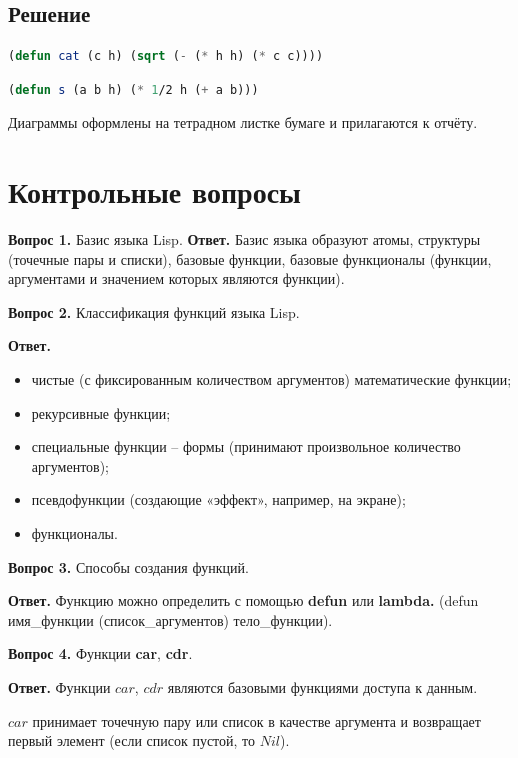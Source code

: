 \documentclass[12pt]{report}
\begin{document}
\subsection*{Решение}
\begin{lstlisting}[label=101xd,caption=Решение задания №10.1, language=lisp]
(defun cat (c h) (sqrt (- (* h h) (* c c))))
\end{lstlisting}
\begin{lstlisting}[label=102xd,caption=Решение задания №10.2, language=lisp]
(defun s (a b h) (* 1/2 h (+ a b)))
\end{lstlisting}
Диаграммы оформлены на тетрадном листке бумаге и прилагаются к отчёту.
\section*{Контрольные вопросы}

\textbf{Вопрос 1.} Базис языка Lisp. \newline
\indent\textbf{Ответ. }
Базис языка образуют атомы, структуры (точечные пары и списки), базовые функции, базовые функционалы (функции, аргументами и значением которых являются функции).

\textbf{Вопрос 2.} Классификация функций языка Lisp.
	
\textbf{Ответ.} 
	
\begin{itemize}
	\item чистые (с фиксированным количеством аргументов) математические функции;
	\item рекурсивные функции;
	\item специальные функции – формы (принимают произвольное количество аргументов);
	\item псевдофункции (создающие «эффект», например, на экране);
	\item функционалы.
\end{itemize}

\textbf{Вопрос 3.} Способы создания функций.
	
\textbf{Ответ.} 
Функцию можно определить с помощью \textbf{defun} или \textbf{lambda.} (defun имя\_функции (список\_аргументов) тело\_функции).

\textbf{Вопрос 4.} Функции \textbf{car}, \textbf{cdr}.
	
\textbf{Ответ.} Функции $car$, $cdr$ являются базовыми функциями доступа к данным. 

$car$ принимает точечную пару или список в качестве аргумента и возвращает первый элемент (если список пустой, то $Nil$). 
\end{document}
